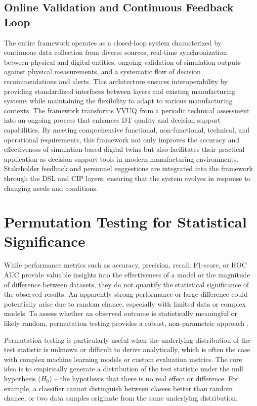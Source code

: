 \subsection{Online Validation and Continuous Feedback Loop}
\label{sec:online-validation}
The entire framework operates as a closed-loop system characterized by continuous data collection from diverse sources, real-time synchronization between physical and digital entities, ongoing validation of simulation outputs against physical measurements, and a systematic flow of decision recommendations and alerts. This architecture ensures interoperability by providing standardized interfaces between layers and existing manufacturing systems while maintaining the flexibility to adapt to various manufacturing contexts. The framework transforms VVUQ from a periodic technical assessment into an ongoing process that enhances DT quality and decision support capabilities. By meeting comprehensive functional, non-functional, technical, and operational requirements, this framework not only improves the accuracy and effectiveness of simulation-based digital twins but also facilitates their practical application as decision support tools in modern manufacturing environments. Stakeholder feedback and personnel suggestions are integrated into the framework through the DSL and CIP layers, ensuring that the system evolves in response to changing needs and conditions.

\section{Permutation Testing for Statistical Significance}
\label{sec:permtest}

While performance metrics such as accuracy, precision, recall, F1-score, or ROC AUC provide valuable insights into the effectiveness of a model or the magnitude of difference between datasets, they do not quantify the statistical significance of the observed results. An apparently strong performance or large difference could potentially arise due to random chance, especially with limited data or complex models. To assess whether an observed outcome is statistically meaningful or likely random, permutation testing provides a robust, non-parametric approach \autocite{welch1990construction}.

Permutation testing is particularly useful when the underlying distribution of the test statistic is unknown or difficult to derive analytically, which is often the case with complex machine learning models or custom evaluation metrics. The core idea is to empirically generate a distribution of the test statistic under the null hypothesis ($H_0$) – the hypothesis that there is no real effect or difference. For example, a classifier cannot distinguish between classes better than random chance, or two data samples originate from the same underlying distribution.


